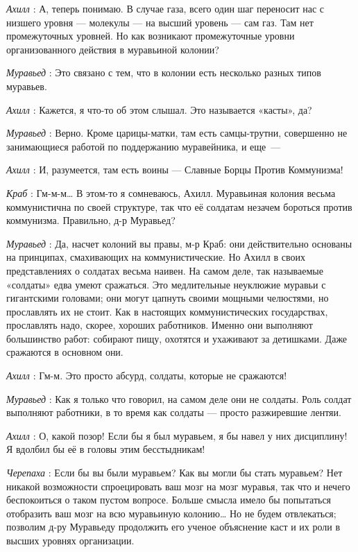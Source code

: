 \documentclass[../main.tex]{subfiles}
\begin{document}
\begin{dialogue}
\emph{Ахилл} : А, теперь понимаю. В случае газа, всего один шаг переносит нас с низшего уровня --- молекулы --- на высший уровень --- сам газ. Там нет промежуточных уровней. Но как возникают промежуточные уровни организованного действия в муравьиной колонии?

\emph{Муравьед} : Это связано с тем, что в колонии есть несколько разных типов муравьев.

\emph{Ахилл} : Кажется, я что-то об этом слышал. Это называется «касты», да?

\emph{Муравьед} : Верно. Кроме царицы-матки, там есть самцы-трутни, совершенно не занимающиеся работой по поддержанию муравейника, и еще~---

\emph{Ахилл} : И, разумеется, там есть воины --- Славные Борцы Против Коммунизма!

\emph{Краб} : Гм-м-м\ldots{} В этом-то я сомневаюсь, Ахилл. Муравьиная колония весьма коммунистична по своей структуре, так что её солдатам незачем бороться против коммунизма. Правильно, д-р Муравьед?

\emph{Муравьед} : Да, насчет колоний вы правы, м-р Краб: они действительно основаны на принципах, смахивающих на коммунистические. Но Ахилл в своих представлениях о солдатах весьма наивен. На самом деле, так называемые «солдаты» едва умеют сражаться. Это медлительные неуклюжие муравьи с гигантскими головами; они могут цапнуть своими мощными челюстями, но прославлять их не стоит. Как в настоящих коммунистических государствах, прославлять надо, скорее, хороших работников. Именно они выполняют большинство работ: собирают пищу, охотятся и ухаживают за детишками. Даже сражаются в основном они.

\emph{Ахилл} : Гм-м. Это просто абсурд, солдаты, которые не сражаются!

\emph{Муравьед} : Как я только что говорил, на самом деле они не солдаты. Роль солдат выполняют работники, в то время как солдаты --- просто разжиревшие лентяи.

\emph{Ахилл} : О, какой позор! Если бы я был муравьем, я бы навел у них дисциплину! Я вдолбил бы её в головы этим бесстыдникам!

\emph{Черепаха} : Если бы вы были муравьем? Как вы могли бы стать муравьем? Нет никакой возможности спроецировать ваш мозг на мозг муравья, так что и нечего беспокоиться о таком пустом вопросе. Больше смысла имело бы попытаться отобразить ваш мозг на всю муравьиную колонию\ldots{} Но не будем отвлекаться; позволим д-ру Муравьеду продолжить его ученое объяснение каст и их роли в высших уровнях организации.


\end{dialogue}
\end{document}
